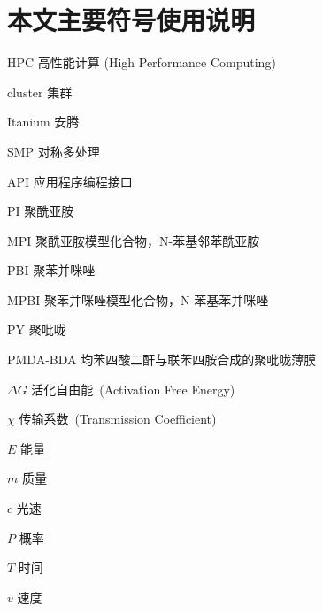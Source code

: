 \chapter*{本文主要符号使用说明}

\begin{denotation}

\item[HPC] 高性能计算 (High Performance Computing)
\item[cluster] 集群
\item[Itanium] 安腾
\item[SMP] 对称多处理
\item[API] 应用程序编程接口
\item[PI]	聚酰亚胺
\item[MPI]	聚酰亚胺模型化合物，N-苯基邻苯酰亚胺
\item[PBI]	聚苯并咪唑
\item[MPBI]	聚苯并咪唑模型化合物，N-苯基苯并咪唑
\item[PY]	聚吡咙
\item[PMDA-BDA]	均苯四酸二酐与联苯四胺合成的聚吡咙薄膜
\item[$\Delta G$]  	活化自由能~(Activation Free Energy)
\item [$\chi$] 传输系数~(Transmission Coefficient)
\item[$E$] 能量
\item[$m$] 质量
\item[$c$] 光速
\item[$P$] 概率
\item[$T$] 时间
\item[$v$] 速度

\end{denotation}
